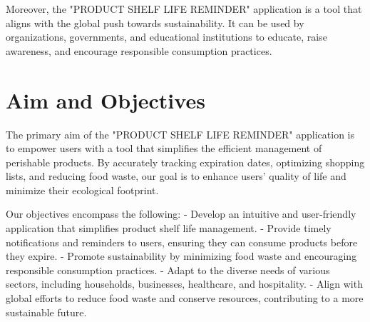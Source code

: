 Moreover, the "PRODUCT SHELF LIFE REMINDER" application is a tool that aligns with the global push towards sustainability. It can be used by organizations, governments, and educational institutions to educate, raise awareness, and encourage responsible consumption practices.

\section{Aim and Objectives}


The primary aim of the "PRODUCT SHELF LIFE REMINDER" application is to empower users with a tool that simplifies the efficient management of perishable products. By accurately tracking expiration dates, optimizing shopping lists, and reducing food waste, our goal is to enhance users' quality of life and minimize their ecological footprint.

Our objectives encompass the following:
- Develop an intuitive and user-friendly application that simplifies product shelf life management.
- Provide timely notifications and reminders to users, ensuring they can consume products before they expire.
- Promote sustainability by minimizing food waste and encouraging responsible consumption practices.
- Adapt to the diverse needs of various sectors, including households, businesses, healthcare, and hospitality.
- Align with global efforts to reduce food waste and conserve resources, contributing to a more sustainable future.
